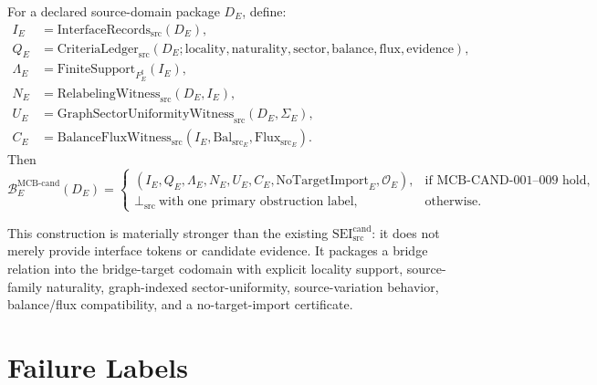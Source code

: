 \documentclass[11pt]{article}
\newcommand{\SEICand}{\mathrm{SEI}_{\mathrm{src}}^{\mathrm{cand}}}
\newcommand{\NoTargetImport}{\mathrm{NoTargetImport}}
\newcommand{\BalSrc}{\mathrm{Bal}_{\mathrm{src}}}
\newcommand{\FluxSrc}{\mathrm{Flux}_{\mathrm{src}}}
\newcommand{\BottomSrc}{\bot_{\mathrm{src}}}
\begin{document}
For a declared source-domain package \(D_E\), define:
\[
\begin{aligned}
  I_E &= \mathrm{InterfaceRecords}_{\mathrm{src}}(D_E),\\
  Q_E &= \mathrm{CriteriaLedger}_{\mathrm{src}}(D_E;
       \mathrm{locality},\mathrm{naturality},\mathrm{sector},
       \mathrm{balance},\mathrm{flux},\mathrm{evidence}),\\
  \Lambda_E &= \mathrm{FiniteSupport}_{F_E^\sharp}(I_E),\\
  N_E &= \mathrm{RelabelingWitness}_{\mathrm{src}}(D_E,I_E),\\
  U_E &= \mathrm{GraphSectorUniformityWitness}_{\mathrm{src}}(D_E,\Sigma_E),\\
  C_E &= \mathrm{BalanceFluxWitness}_{\mathrm{src}}(I_E,\BalSrc_E,\FluxSrc_E).
\end{aligned}
\]
Then
\[
  \mathcal{B}^{\mathrm{MCB\text{-}cand}}_E(D_E)
  =
  \begin{cases}
    (I_E,Q_E,\Lambda_E,N_E,U_E,C_E,\NoTargetImport_E,\mathcal{O}_E),
    & \text{if MCB-CAND-001--009 hold},\\
    \BottomSrc\ \text{with one primary obstruction label},
    & \text{otherwise.}
  \end{cases}
\]

This construction is materially stronger than the existing
\(\SEICand\): it does not merely provide interface tokens or candidate
evidence. It packages a bridge relation into the bridge-target codomain with
explicit locality support, source-family naturality, graph-indexed
sector-uniformity, source-variation behavior, balance/flux compatibility, and
a no-target-import certificate.

\section{Failure Labels}
\label{sec:failure-labels}
\end{document}

